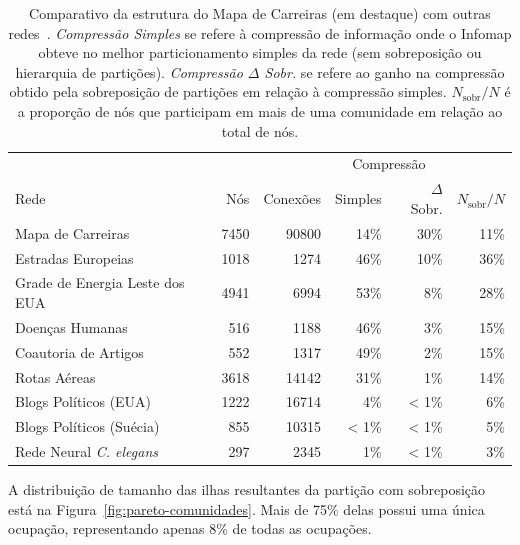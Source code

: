 \documentclass[
  article,
  11pt,
  a4paper,
  english,
  brazil,
  sumario=tradicional]{abntex2}
\begin{document}
\begin{table}
  \centering
  \begin{tabular}{@{} l r r r r r @{}}
    \toprule
                                           &      &          & \multicolumn{2}{c}{Compressão} & \\
    \cmidrule(r){4-5}
    Rede                                   & Nós  & Conexões & Simples & $\Delta$ Sobr.       & $N_{\text{sobr}}/N$ \\
    \midrule
    \rowcolor{yellow!25} Mapa de Carreiras & 7450 & 90800    & 14\%    & 30\%                 & 11\% \\
    Estradas Europeias                     & 1018 & 1274     & 46\%    & 10\%                 & 36\% \\
    Grade de Energia Leste dos EUA         & 4941 & 6994     & 53\%    & 8\%                  & 28\% \\
    Doenças Humanas                        & 516  & 1188     & 46\%    & 3\%                  & 15\% \\
    Coautoria de Artigos                   & 552  & 1317     & 49\%    & 2\%                  & 15\% \\
    Rotas Aéreas                           & 3618 & 14142    & 31\%    & 1\%                  & 14\% \\
    Blogs Políticos (EUA)                  & 1222 & 16714    & 4\%     & < 1\%                & 6\% \\
    Blogs Políticos (Suécia)               & 855  & 10315    & < 1\%   & < 1\%                & 5\% \\
    Rede Neural \textit{C. elegans}        & 297  & 2345     & 1\%     & < 1\%                & 3\% \\
    \bottomrule
  \end{tabular}
  \caption{Comparativo da estrutura do Mapa de Carreiras (em destaque) com outras redes~\cite{Viamontes_Esquivel2011-it}. \textit{Compressão Simples} se refere à compressão de informação onde o Infomap obteve no melhor particionamento simples da rede (sem sobreposição ou hierarquia de partições). \textit{Compressão $\Delta$ Sobr.} se refere ao ganho na compressão obtido pela sobreposição de partições em relação à compressão simples. $N_{\text{sobr}}/N$ é a proporção de nós que participam em mais de uma comunidade em relação ao total de nós.}
  \label{tab:comparativo}
\end{table}

A distribuição de tamanho das ilhas resultantes da partição com sobreposição está na Figura~\ref{fig:pareto-comunidades}. Mais de 75\% delas possui uma única ocupação, representando apenas 8\% de todas as ocupações.
\end{document}
